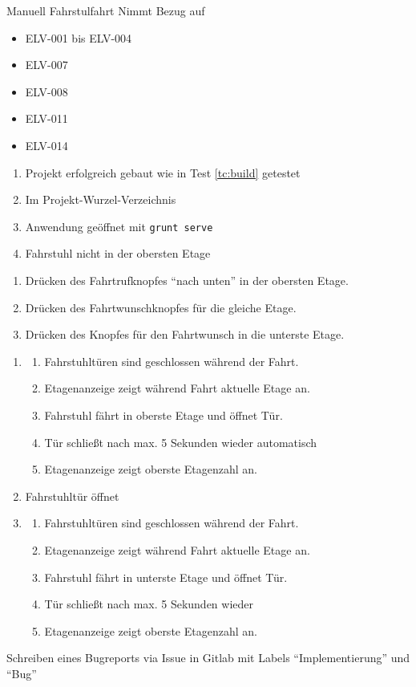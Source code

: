 \begin{testcase}{Manuell}
\tcSubject Fahrstulfahrt
\tcRemark Nimmt Bezug auf
	\begin{itemize}
	\item ELV-001 bis ELV-004
	\item ELV-007
	\item ELV-008
	\item ELV-011
	\item ELV-014
	\end{itemize}
\tcConditions
	\begin{enumerate}
	\item Projekt erfolgreich gebaut wie in Test \ref{tc:build} getestet
	\item Im Projekt-Wurzel-Verzeichnis
	\item Anwendung geöffnet mit \texttt{grunt serve}
	\item Fahrstuhl nicht in der obersten Etage
	\end{enumerate}
\tcProceeding
	\begin{enumerate}
	\item Drücken des Fahrtrufknopfes "`nach unten"' in der obersten Etage.
	\item Drücken des Fahrtwunschknopfes für die gleiche Etage.
	\item Drücken des Knopfes für den Fahrtwunsch in die unterste Etage.
	\end{enumerate}
\tcGoal
	\begin{enumerate}
		\item
		\begin{enumerate}
			\item Fahrstuhltüren sind geschlossen während der Fahrt.
			\item Etagenanzeige zeigt während Fahrt aktuelle Etage an.
			\item Fahrstuhl fährt in oberste Etage und öffnet Tür.
			\item Tür schließt nach max. 5 Sekunden wieder automatisch
			\item Etagenanzeige zeigt oberste Etagenzahl an.
		\end{enumerate}
		\item Fahrstuhltür öffnet
		\item
		\begin{enumerate}
			\item Fahrstuhltüren sind geschlossen während der Fahrt.
			\item Etagenanzeige zeigt während Fahrt aktuelle Etage an.
			\item Fahrstuhl fährt in unterste Etage und öffnet Tür.
			\item Tür schließt nach max. 5 Sekunden wieder
			\item Etagenanzeige zeigt oberste Etagenzahl an.
		\end{enumerate}
	\end{enumerate}
\tcError Schreiben eines Bugreports via Issue in Gitlab mit Labels "`Implementierung"' und "`Bug"'
\end{testcase}

